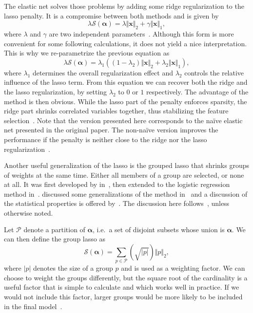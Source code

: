 The elastic net solves those problems by adding some ridge regularization to the
lasso penalty.
It is a compromise between both methods and is given by
\begin{equation}
  \label{eq:elastic-net}
  \lambda \mathcal{S}(\bm{\alpha}) = \lambda \Vert \bm{x} \Vert_2 +  \gamma \Vert \bm{x} \Vert _1,
\end{equation}
where \(\lambda\) and \(\gamma\) are two independent parameters~\cite{elasticnet}.
Although this form is more convenient for some following calculations, it does
not yield a nice interpretation.
This is why we re-parametrize the previous equation as
\begin{equation*}
  \lambda \mathcal{S}(\bm{\alpha}) = \lambda_1 \left( \left(1 - \lambda_2 \right) \Vert \bm{x} \Vert_2  + \lambda_2 \Vert \bm{x} \Vert _1\right),
\end{equation*}
where \(\lambda_1\) determines the overall regularization effect and \(\lambda_2\) controls the relative influence of the lasso term.
From this equation we can recover both the ridge and the lasso regularization, by setting \(\lambda_2\) to \(0\) or \(1\) respectively.
The advantage of the method is then obvious.
While the lasso part of the penalty enforces sparsity, the ridge part shrinks
correlated variables together, thus stabilizing the feature selection~\cite{elasticnet}.
Note that the version presented here corresponds to the naïve elastic net
presented in the original paper.
The non-naïve version improves the performance if the penalty is neither close
to the ridge nor the lasso regularization~\cite{elasticnet}.

Another useful generalization of the lasso is the grouped lasso that shrinks groups of weights at the same time.
Either all members of a group are selected, or none at all.
It was first developed by \citeauthor{grouplasso} in~\cite{grouplasso}, then
extended to the logistic regression method in~\cite{grouplasso-logistic}.
\citeauthor{grouplasso-generalizations} discussed some generalizations of the
method in~\cite{grouplasso-generalizations} and a discussion of the statistical
properties is offered by~\cite{grouplasso-benefit}.
The discussion here follows~\cite{sparse-learning}, unless otherwise noted.

Let \(\mathcal{P}\) denote a partition of \(\bm{\alpha}\), i.e.~a set of disjoint subsets whose union is \(\bm{\alpha}\).
We can then define the group lasso as
\begin{equation*}
  \mathcal{S}({\bm{\alpha}}) = \sum_{p \in \mathcal{P}} \left(\sqrt{\vert p \vert}\right) \Vert  p \Vert_2,
\end{equation*}
where \(\vert p \vert\) denotes the size of a group \(p\) and is used as a weighting factor.
We can choose to weight the groups differently, but the square root of the
cardinality is a useful factor that is simple to calculate and which works well in practice.
If we would not include this factor, larger groups would be more likely to be included in the final model~\cite{sparse-learning}.

